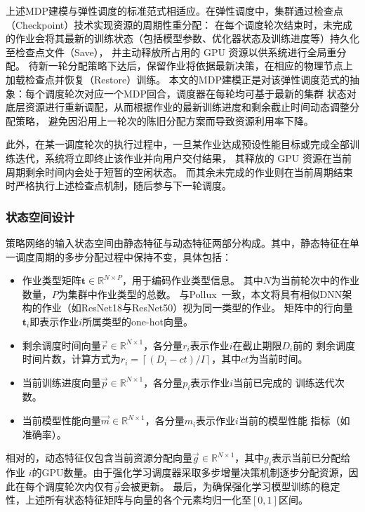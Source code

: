 上述MDP建模与弹性调度的标准范式相适应。在弹性调度中，集群通过检查点（Checkpoint）技术实现资源的周期性重分配：
在每个调度轮次结束时，未完成的作业会将其最新的训练状态（包括模型参数、优化器状态及训练进度等）持久化至检查点文件（Save），
并主动释放所占用的 GPU 资源以供系统进行全局重分配。
待新一轮分配策略下达后，保留作业将依据最新决策，在相应的物理节点上加载检查点并恢复（Restore）训练。
本文的MDP建模正是对该弹性调度范式的抽象：每个调度轮次对应一个MDP回合，调度器在每轮均可基于最新的集群
状态对底层资源进行重新调配，从而根据作业的最新训练进度和剩余截止时间动态调整分配策略，
避免因沿用上一轮次的陈旧分配方案而导致资源利用率下降。

此外，在某一调度轮次的执行过程中，一旦某作业达成预设性能目标或完成全部训练迭代，系统将立即终止该作业并向用户交付结果，
其释放的 GPU 资源在当前周期剩余时间内会处于短暂的空闲状态。
而其余未完成的作业则在当前周期结束时严格执行上述检查点机制，随后参与下一轮调度。

\subsubsection{状态空间设计}\label{subsec:state}

策略网络的输入状态空间由静态特征与动态特征两部分构成。其中，静态特征在单一调度周期的多步分配过程中保持不变，具体包括：
\begin{itemize}
  \item 作业类型矩阵$\mathbf{t} \in \mathbb{R}^{N \times P}$，用于编码作业类型信息。
        其中$N$为当前轮次中的作业数量，$P$为集群中作业类型的总数。
        与Pollux~\cite{qiao2021pollux}一致，本文将具有相似DNN架构的作业（如ResNet18与ResNet50）视为同一类型的作业。
        矩阵中的行向量$\mathbf{t}_i$即表示作业$i$所属类型的one-hot向量。
  \item 剩余调度时间向量$\vec{r} \in \mathbb{R}^{N \times 1}$，各分量$r_i$表示作业$i$在截止期限$D_i$前的
        剩余调度时间片数，计算方式为$r_i = \left\lceil \left(D_i - ct\right) / I \right\rceil$，其中$ct$为当前时间。
  \item 当前训练进度向量$\vec{p} \in \mathbb{R}^{N \times 1}$，各分量$p_i$表示作业$i$当前已完成的
        训练迭代次数。
  \item 当前模型性能向量$\vec{m} \in \mathbb{R}^{N \times 1}$，各分量$m_i$表示作业$i$当前的模型性能
        指标（如准确率）。
\end{itemize}

相对的，动态特征仅包含当前资源分配向量$\vec{g} \in \mathbb{R}^{N \times 1}$，其中$g_i$表示当前已分配给作业
$i$的GPU数量。由于强化学习调度器采取多步增量决策机制逐步分配资源，因此在每个调度轮次内仅有$\vec{g}$会被更新。
最后，为确保强化学习模型训练的稳定性，上述所有状态特征矩阵与向量的各个元素均归一化至$\left[0, 1\right]$区间。

